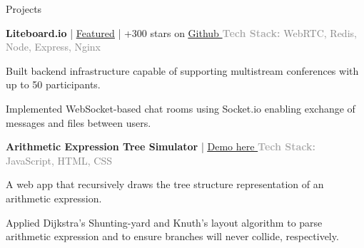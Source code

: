 \documentclass[hidelinks]{resume} %
\begin{document}
\begin{rSection}{Projects}
\vspace{-.1cm}
\begin{rSubsection}{\textbf{Liteboard.io} | \href{https://falauniversidades.com.br/projeto-gratuito-simplifica-o-acesso-as-aulas-on-line/}{\underline{Featured}} | +300 stars on \href{https://github.com/jeverd/lecture-experience}{\underline{Github} \faGithub}}{\small \textcolor{darkgray}{\textbf{Tech Stack:} \textcolor{gray}{WebRTC, Redis, Node, Express, Nginx}}}{}
        \par
        \begin{bulletpoints}
            \vspace{-.10cm}
            \item Built backend infrastructure capable of supporting multistream conferences with up to 50 participants. 
            \vspace{-.13cm}
            \item Implemented WebSocket-based chat rooms using Socket.io enabling exchange of messages and files between users.
            \vspace{-.10cm}
        \end{bulletpoints}
\end{rSubsection}

\begin{rSubsection}{{\textbf{Arithmetic Expression Tree Simulator}} |
\href{https://lnogueir.github.io/expression-tree-gen/}{\underline{Demo here } \faGithub}}{\small \textcolor{darkgray}{\textbf{Tech Stack:} \textcolor{gray}{JavaScript, HTML, CSS}}}{}
\par
    \begin{bulletpoints}
        \vspace{-.10cm}
        \item A web app that recursively draws the tree structure representation of an arithmetic expression.
        \vspace{-.13cm}
        \item Applied Dijkstra's Shunting-yard and Knuth's layout algorithm to parse arithmetic expression and to ensure branches will never collide, respectively.
        \vspace{-.25cm}
    \end{bulletpoints}
\end{rSubsection}

\end{rSection}






\end{document}
